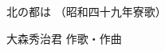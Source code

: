 \documentclass[10pt,b5j]{tarticle} %
\begin{document}
\begin{minipage}[c]{0.7\hsize} %
    \begin{center}
        {\LARGE
            北の都は %
        }
        {\small 
            （昭和四十九年寮歌） %
        }
    \end{center}
\end{minipage}
\begin{minipage}[c]{0.3\hsize} %
    \begin{flushright} %
        大森秀治君 作歌・作曲 %
    \end{flushright}
\end{minipage}
\end{document}
